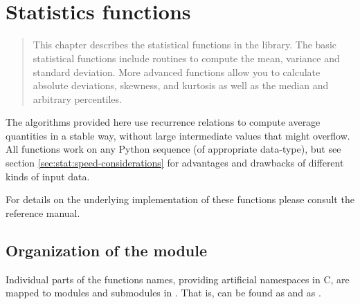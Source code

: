 \chapter[\protect\module{pygsl.statistics} --- Statistics
functions]{\protect{} \\ Statistics functions}
\label{cha:statistics-module}



\begin{quote}
   This chapter describes the statistical functions in the library.  The basic
   statistical functions include routines to compute the mean, variance and
   standard deviation. More advanced functions allow you to calculate absolute
   deviations, skewness, and kurtosis as well as the median and arbitrary
   percentiles.
\end{quote}

The algorithms provided here use recurrence relations to compute average
quantities in a stable way, without large intermediate values that might
overflow.  All functions work on any Python sequence (of appropriate
data-type), but see section \ref{sec:stat:speed-considerations} for advantages
and drawbacks of different kinds of input data.

\begin{seealso}
   For details on the underlying implementation of these functions please
   consult the \GSL{} reference manual.
\end{seealso}



\section{Organization of the module}
\label{sec:stat:organization}

Individual parts of the \gsl{} functions names, providing artificial namespaces
in C, are mapped to modules and submodules in \pygsl{}.  That is,
 can be found as  and
 as .

